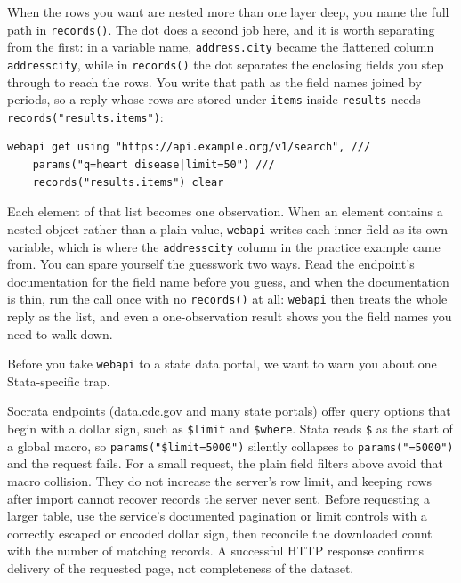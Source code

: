 When the rows you want are nested more than one layer deep, you name the full path in \texttt{records()}. The dot does a second job here, and it is worth separating from the first: in a variable name, \texttt{address.city} became the flattened column \texttt{addresscity}, while in \texttt{records()} the dot separates the enclosing fields you step through to reach the rows. You write that path as the field names joined by periods, so a reply whose rows are stored under \texttt{items} inside \texttt{results} needs \texttt{records("results.items")}:
\par
{\footnotesize
\begin{verbatim}
webapi get using "https://api.example.org/v1/search", ///
    params("q=heart disease|limit=50") ///
    records("results.items") clear
\end{verbatim}
}
Each element of that list becomes one observation. When an element contains a nested object rather than a plain value, \texttt{webapi} writes each inner field as its own variable, which is where the \texttt{addresscity} column in the practice example came from. You can spare yourself the guesswork two ways. Read the endpoint's documentation for the field name before you guess, and when the documentation is thin, run the call once with no \texttt{records()} at all: \texttt{webapi} then treats the whole reply as the list, and even a one-observation result shows you the field names you need to walk down.

Before you take \texttt{webapi} to a state data portal, we want to warn you about one Stata-specific trap.

\begin{vizcallout}
Socrata endpoints (data.cdc.gov and many state portals) offer query options that begin with a dollar sign, such as \texttt{\$limit} and \texttt{\$where}. Stata reads \texttt{\$} as the start of a global macro, so \texttt{params("\$limit=5000")} silently collapses to \texttt{params("=5000")} and the request fails. For a small request, the plain field filters above avoid that macro collision. They do not increase the server's row limit, and keeping rows after import cannot recover records the server never sent. Before requesting a larger table, use the service's documented pagination or limit controls with a correctly escaped or encoded dollar sign, then reconcile the downloaded count with the number of matching records. A successful HTTP response confirms delivery of the requested page, not completeness of the dataset.
\end{vizcallout}

